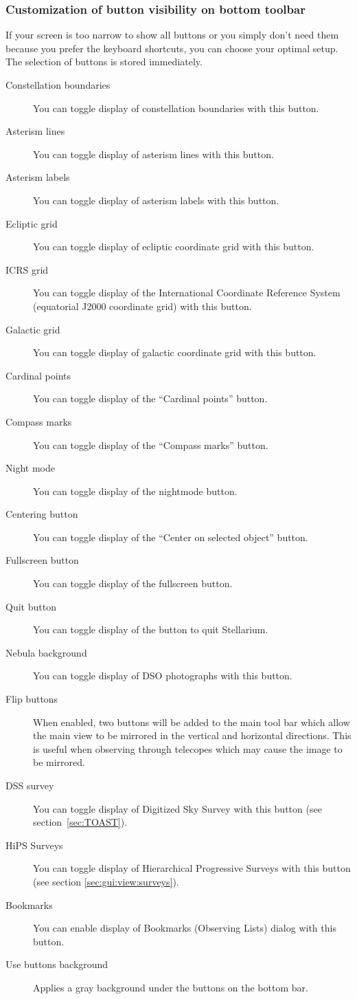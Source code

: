\subsubsection{Customization of button visibility on bottom toolbar}
If your screen is too narrow to show all buttons
or you simply don't need them because you prefer the keyboard shortcuts,
you can choose your optimal setup. The selection of buttons is stored immediately. 
\begin{description}
\item[Constellation boundaries] You can toggle display of constellation boundaries with this button.
\item[Asterism lines] You can toggle display of asterism lines with this button.
\item[Asterism labels] You can toggle display of asterism labels with this button.
\item[Ecliptic grid] You can toggle display of ecliptic coordinate grid with this button.
\item[ICRS grid] You can toggle display of the International Coordinate Reference System (equatorial J2000 coordinate grid) with this button.
\item[Galactic grid] You can toggle display of galactic coordinate grid with this button.
\item[Cardinal points] You can toggle display of the ``Cardinal points'' button.
\item[Compass marks] You can toggle display of the ``Compass marks'' button.
\item[Night mode] You can toggle display of the nightmode button.
\item[Centering button] You can toggle display of the ``Center on selected object'' button.
\item[Fullscreen button] You can toggle display of the fullscreen button.
\item[Quit button] You can toggle display of the button to quit Stellarium.
\item[Nebula background] You can toggle display of DSO photographs with this button.
\item[Flip buttons] When enabled, two buttons will be added to
  the main tool bar which allow the main view to be mirrored in the
  vertical and horizontal directions. This is useful when observing
  through telecopes which may cause the image to be mirrored.
\item[DSS survey] You can toggle display of Digitized Sky Survey with this button (see section~\ref{sec:TOAST}).
\item[HiPS Surveys] You can toggle display of Hierarchical Progressive Surveys with this button (see section \ref{sec:gui:view:surveys}).
\item[Bookmarks] You can enable display of Bookmarks (Observing Lists) dialog with this button.
\item[Use buttons background] Applies a gray background under the buttons on the bottom bar.
\end{description}

